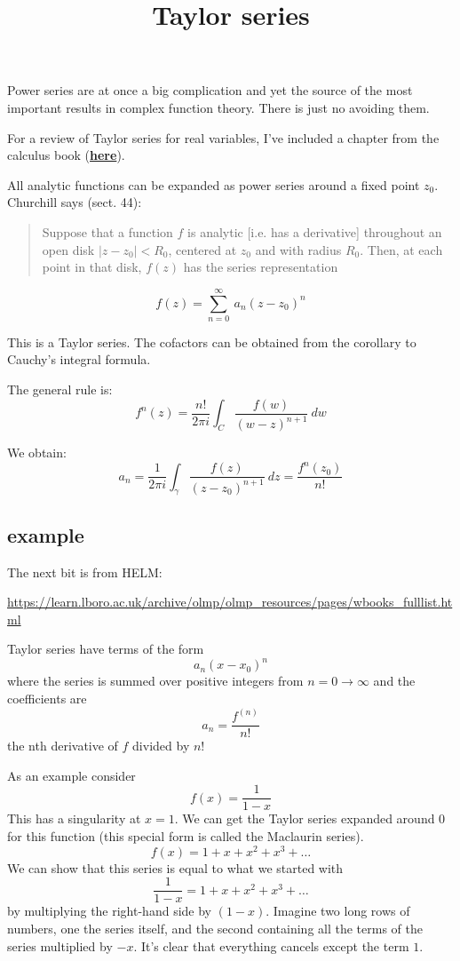 \documentclass[11pt, oneside]{article}
\title{Taylor series}
\date{}
\begin{document}
\maketitle
\Large


Power series are at once a big complication and yet the source of the most important results in complex function theory.  There is just no avoiding them.

For a review of Taylor series for real variables, I've included a chapter from the calculus book (\hyperref[sec:taylor_real]{\textbf{here}}).

All analytic functions can be expanded as power series around a fixed point $z_0$.  Churchill says (sect. 44):

\begin{quote}Suppose that a function $f$ is analytic [i.e. has a derivative] throughout an open disk $|z - z_0| < R_0$, centered at $z_0$ and with radius $R_0$.  Then, at each point in that disk, $f(z)$ has the series representation\end{quote}

\[ f(z) = \sum_{n=0}^{\infty} \ a_n(z - z_0)^n \]

This is a Taylor series.  The cofactors can be obtained from the corollary to Cauchy's integral formula.

The general rule is:
\[ f^n(z) = \frac{n!}{2 \pi i} \int_C \frac{f(w)}{(w - z)^{n+1}} \ dw \]

We obtain:
\[ a_n = \frac{1}{2 \pi i} \int_{\gamma} \frac{f(z)}{(z - z_0)^{n+1}} \ dz = \frac{f^n (z_0)}{n!} \]

\subsection*{example}

The next bit is from HELM:

\url{https://learn.lboro.ac.uk/archive/olmp/olmp_resources/pages/wbooks_fulllist.html}

Taylor series have terms of the form
\[ a_n (x-x_0)^n \] 
where the series is summed over positive integers from $n = 0 \rightarrow \infty$ and the coefficients are
\[ a_n = \frac{f^{(n)}}{n!} \]
the nth derivative of $f$ divided by $n!$

As an example consider
\[ f(x) = \frac{1}{1 - x} \]
This has a singularity at $x = 1$.  We can get the Taylor series expanded around $0$ for this function (this special form is called the Maclaurin series).
\[ f(x) = 1 + x + x^2 + x^3 + \dots \]
We can show that this series is equal to what we started with
\[ \frac{1}{1 - x} = 1 + x + x^2 + x^3 + \dots \]
by multiplying the right-hand side by $(1-x)$.  Imagine two long rows of numbers, one the series itself, and the second containing all the terms of the series multiplied by $-x$.  It's clear that everything cancels except the term $1$.
\end{document}

